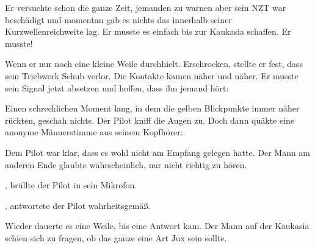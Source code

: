 \par

Er versuchte schon die ganze Zeit, jemanden zu warnen aber sein NZT war beschädigt und momentan gab es nichts das innerhalb seiner Kurzwellenreichweite lag. Er musste es einfach bis zur Kaukasia schaffen. Er musste!

\par

Wenn er nur noch eine kleine Weile durchhielt. Erschrocken, stellte er fest, dass sein Triebwerk Schub verlor. Die Kontakte kamen näher und näher. Er musste sein Signal jetzt absetzen und hoffen, dass ihn jemand hört: 

\par

Einen schrecklichen Moment lang, in dem die gelben Blickpunkte immer näher rückten, geschah nichts. Der Pilot kniff die Augen zu. Doch dann quäkte eine anonyme Männerstimme aus seinem Kopfhörer: 

\par

Dem Pilot war klar, dass es wohl nicht am Empfang gelegen hatte. Der Mann am anderen Ende glaubte wahrscheinlich, nur nicht richtig zu hören.

\par

, brüllte der Pilot in sein Mikrofon.

\par


\par

, antwortete der Pilot wahrheitsgemäß. 

\par

Wieder dauerte es eine Weile, bis eine Antwort kam. Der Mann auf der Kaukasia schien sich zu fragen, ob das ganze eine Art Jux sein sollte. 

\par

